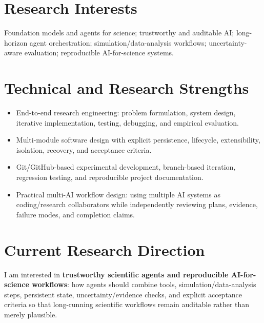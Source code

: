 \documentclass[10pt,a4paper]{article}
\begin{document}
\section{Research Interests}
Foundation models and agents for science; trustworthy and auditable AI; long-horizon agent orchestration; simulation/data-analysis workflows; uncertainty-aware evaluation; reproducible AI-for-science systems.

\section{Technical and Research Strengths}
\begin{itemize}
  \item End-to-end research engineering: problem formulation, system design, iterative implementation, testing, debugging, and empirical evaluation.
  \item Multi-module software design with explicit persistence, lifecycle, extensibility, isolation, recovery, and acceptance criteria.
  \item Git/GitHub-based experimental development, branch-based iteration, regression testing, and reproducible project documentation.
  \item Practical multi-AI workflow design: using multiple AI systems as coding/research collaborators while independently reviewing plans, evidence, failure modes, and completion claims.
\end{itemize}

\section{Current Research Direction}
I am interested in \textbf{trustworthy scientific agents and reproducible AI-for-science workflows}: how agents should combine tools, simulation/data-analysis steps, persistent state, uncertainty/evidence checks, and explicit acceptance criteria so that long-running scientific workflows remain auditable rather than merely plausible.
\end{document}
